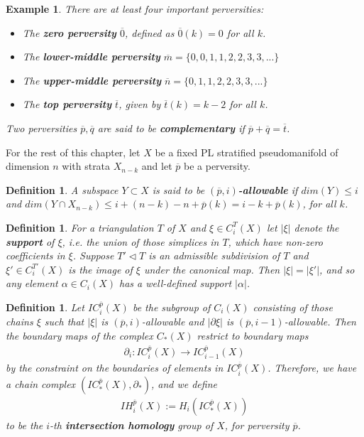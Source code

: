 \documentclass{scrreprt}
\newtheorem{definition}[prop]{Definition}
\newtheorem{example}[prop]{Example}
\begin{document}
\begin{example}
There are at least four important perversities:
\begin{itemize}
\item The \textbf{zero perversity} $\overline{0}$, defined as $\overline{0}(k)=0$ for all $k$.
\item The \textbf{lower-middle perversity} $\overline{m}= \{ 0,0,1,1,2,2,3,3,... \}$
\item The \textbf{upper-middle perversity} $\overline{n}= \{ 0,1,1,2,2,3,3,... \}$
\item The \textbf{top perversity} $\overline{t}$, given by $\overline{t}(k)=k-2$ for all $k$.
\end{itemize}
Two perversities $\overline{p}, \overline{q}$ are said to be \textbf{complementary} if $\overline{p}+ \overline{q}= \overline{t}$.
\end{example}


For the rest of this chapter, let $X$ be a fixed PL stratified pseudomanifold of dimension $n$ with strata $X_{n-k}$  and let $\overline{p}$ be a perversity.

\begin{definition}
A subspace $Y \subset X$ is said to be \textbf{$(\overline{p},i)$-allowable} if $dim(Y) \leq i$ and $dim(Y \cap X_{n-k}) \leq i+(n-k)-n+ \overline{p}(k)=i-k+\overline{p}(k)$, for all $k$.
\end{definition}

\begin{definition}
For a triangulation $T$ of $X$ and $\xi \in C_i^T(X)$ let $|\xi|$ denote the \textbf{support} of $\xi$, i.e. the union of those simplices in $T$, which have non-zero coefficients in $\xi$. Suppose $T' \lhd T$ is an admissible subdivision of $T$ and $\xi' \in C_i^{T'}(X)$ is the image of $\xi$ under the canonical map. Then $|\xi|=|\xi'|$, and so any element $\alpha \in C_i(X)$ has a well-defined support $|\alpha|$.
\end{definition}

\begin{definition}
Let $IC_i^{\overline{p}}(X)$ be the subgroup of $C_i(X)$ consisting of those chains $\xi$ such that $|\xi|$ is $(\overline{p},i)$-allowable and $|\partial \xi|$ is $(\overline{p},i-1)$-allowable. Then the boundary maps of the complex $C_*(X)$ restrict to boundary maps
\begin{align*}
\partial_i : IC_i^{\overline{p}}(X) \to IC_{i-1}^{\overline{p}}(X)
\end{align*}
by the constraint on the boundaries of elements in $IC_i^{\overline{p}}(X)$. Therefore, we have a chain complex $(IC_*^{\overline{p}}(X),\partial_*)$, and we define
\begin{align*}
IH_i^{\overline{p}}(X):=H_i(IC_*^{\overline{p}}(X))
\end{align*}
to be the $i$-th \textbf{intersection homology} group of $X$, for perversity $\overline{p}$.
\end{definition}
\end{document}
